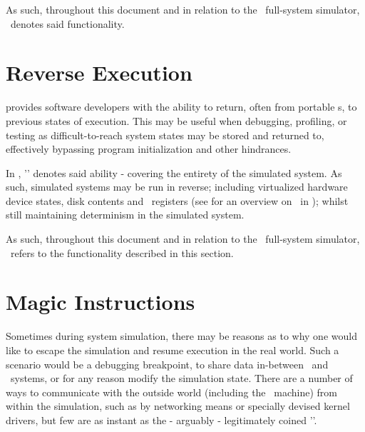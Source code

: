 As such, throughout this document and in relation to the \dvttermsimics\ full-system simulator, \dvttermcheckpointing\ denotes said functionality.

\section{Reverse Execution}
\label{sec:background_reverseexecution}
 provides software developers with the ability to return, often from portable \dvttermcheckpoint s, to previous states of execution.
This may be useful when debugging, profiling, or testing as difficult-to-reach system states may be stored and returned to, effectively bypassing program initialization and other hindrances.

In \dvttermsimics , '\dvttermreverseexecution ' denotes said ability - covering the entirety of the simulated system.
As such, simulated systems may be run in reverse; including virtualized hardware device states, disk contents and \dvttermcpu\ registers (see  for an overview on \dvttermreverseexecution\ in \dvttermsimics ); whilst still maintaining determinism in the simulated system.

As such, throughout this document and in relation to the \dvttermsimics\ full-system simulator, \dvttermreverseexecution\ refers to the functionality described in this section.

\section{Magic Instructions}
\label{sec:background_magicinstructions}
Sometimes during system simulation, there may be reasons as to why one would like to escape the simulation and resume execution in the real world.
Such a scenario would be a debugging breakpoint, to share data in-between \dvttermtarget\ and \dvttermhost\ systems, or for any reason modify the simulation state.
There are a number of ways to communicate with the outside world (including the \dvttermhost\ machine) from within the simulation, such as by networking means or specially devised kernel drivers, but few are as instant as the - arguably - legitimately coined '\dvttermmagicinstruction '.

